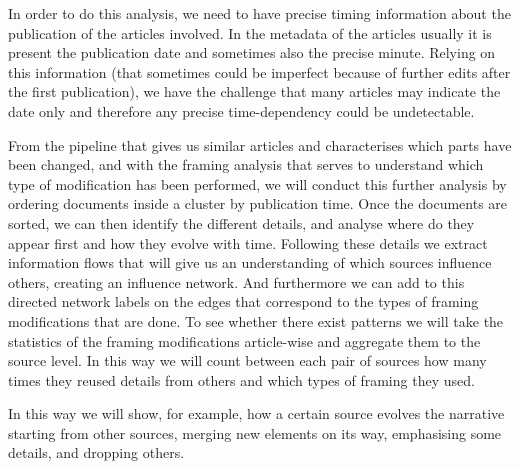 In order to do this analysis, we need to have precise timing information about the publication of the articles involved.
In the metadata of the articles usually it is present the publication date and sometimes also the precise minute.
Relying on this information (that sometimes could be imperfect because of further edits after the first publication), we have the challenge that many articles may indicate the date only and therefore any precise time-dependency could be undetectable.

From the pipeline that gives us similar articles and characterises which parts have been changed, and with the framing analysis that serves to understand which type of modification has been performed, we will conduct this further analysis by ordering documents inside a cluster by publication time.
Once the documents are sorted, we can then identify the different details, and analyse where do they appear first and how they evolve with time.
Following these details we extract information flows that will give us an understanding of which sources influence others, creating an influence network.
And furthermore we can add to this directed network labels on the edges that correspond to the types of framing modifications that are done.
To see whether there exist patterns we will take the statistics of the framing modifications article-wise and aggregate them to the source level.
In this way we will count between each pair of sources how many times they reused details from others and which types of framing they used.

In this way we will show, for example, how a certain source evolves the narrative starting from other sources, merging new elements on its way, emphasising some details, and dropping others.







